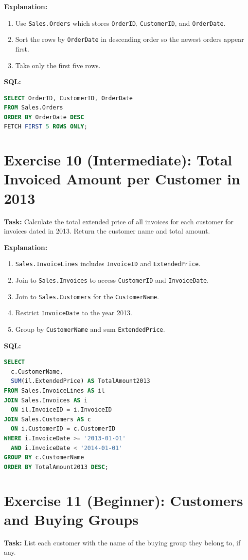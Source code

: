 \documentclass[12pt,a4paper]{article}
\begin{document}
\textbf{Explanation:}
\begin{enumerate}
  \item Use \texttt{Sales.Orders} which stores \texttt{OrderID}, \texttt{CustomerID}, and \texttt{OrderDate}.
  \item Sort the rows by \texttt{OrderDate} in descending order so the newest orders appear first.
  \item Take only the first five rows.
\end{enumerate}

\textbf{SQL:}
\begin{lstlisting}[language=SQL]
SELECT OrderID, CustomerID, OrderDate
FROM Sales.Orders
ORDER BY OrderDate DESC
FETCH FIRST 5 ROWS ONLY;
\end{lstlisting}

\section{Exercise 10 (Intermediate): Total Invoiced Amount per Customer in 2013}
\textbf{Task:} Calculate the total extended price of all invoices for each customer for invoices dated in 2013. Return the customer name and total amount.

\textbf{Explanation:}
\begin{enumerate}
  \item \texttt{Sales.InvoiceLines} includes \texttt{InvoiceID} and \texttt{ExtendedPrice}.
  \item Join to \texttt{Sales.Invoices} to access \texttt{CustomerID} and \texttt{InvoiceDate}.
  \item Join to \texttt{Sales.Customers} for the \texttt{CustomerName}.
  \item Restrict \texttt{InvoiceDate} to the year 2013.
  \item Group by \texttt{CustomerName} and sum \texttt{ExtendedPrice}.
\end{enumerate}

\textbf{SQL:}
\begin{lstlisting}[language=SQL]
SELECT 
  c.CustomerName,
  SUM(il.ExtendedPrice) AS TotalAmount2013
FROM Sales.InvoiceLines AS il
JOIN Sales.Invoices AS i
  ON il.InvoiceID = i.InvoiceID
JOIN Sales.Customers AS c
  ON i.CustomerID = c.CustomerID
WHERE i.InvoiceDate >= '2013-01-01'
  AND i.InvoiceDate < '2014-01-01'
GROUP BY c.CustomerName
ORDER BY TotalAmount2013 DESC;
\end{lstlisting}

\section{Exercise 11 (Beginner): Customers and Buying Groups}
\textbf{Task:} List each customer with the name of the buying group they belong to, if any.
\end{document}
